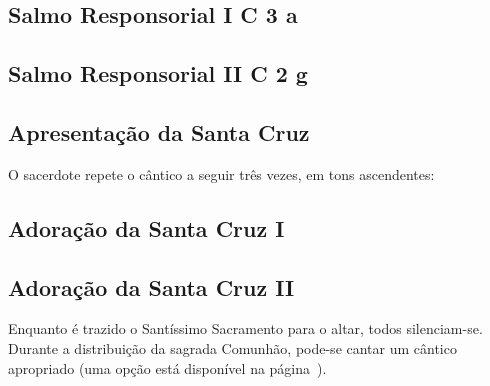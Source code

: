 \subsection[Salmo Responsorial I]{Salmo Responsorial I \textmd{C 3 a}}\label{subsection:hebdomada-sancta/feria-6-in-passione-domini/psalmus-responsorius-1}

\subsection[Salmo Responsorial II]{Salmo Responsorial II \textmd{C 2 g}}\label{subsection:hebdomada-sancta/feria-6-in-passione-domini/psalmus-responsorius-1}

\AllowPageFlush

\subsection{Apresentação da Santa Cruz}\label{subsection:hebdomada-sancta/feria-6-in-passione-domini/ad-detegendam-sanctam-crucem}
\begin{rubrica}
  O sacerdote repete o cântico a seguir três vezes, em tons ascendentes:
\end{rubrica}

\subsection{Adoração da Santa Cruz I}\label{subsection:hebdomada-sancta/feria-6-in-passione-domini/ad-adoratione-sanctam-crucem-1}

\subsection{Adoração da Santa Cruz II}\label{subsection:hebdomada-sancta/feria-6-in-passione-domini/ad-adoratione-sanctam-crucem-2}

\begin{rubrica}
  Enquanto é trazido o Santíssimo Sacramento para o altar, todos silenciam-se. Durante a distribuição da sagrada Comunhão, pode-se cantar um cântico apropriado (uma opção está disponível na página~\pageref{appendix:feria-6-in-passio-domini/communio}).
\end{rubrica}